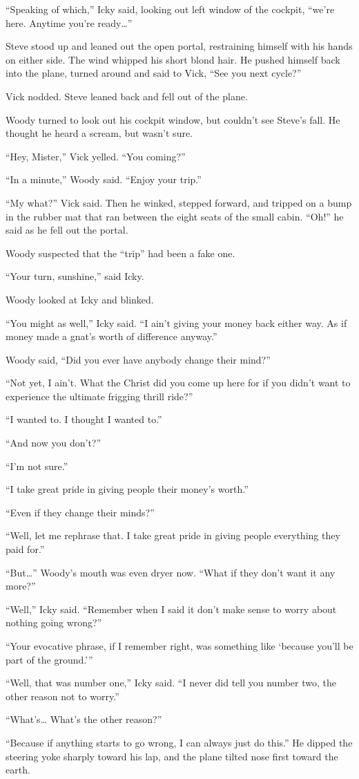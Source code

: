 “Speaking of which,” Icky said, looking out left window of the cockpit, “we’re here. Anytime you’re ready…”

Steve stood up and leaned out the open portal, restraining himself with his hands on either side. The wind whipped his short blond hair. He pushed himself back into the plane, turned around and said to Vick, “See you next cycle?”

Vick nodded. Steve leaned back and fell out of the plane.

Woody turned to look out his cockpit window, but couldn’t see Steve’s fall. He thought he heard a scream, but wasn’t sure.

“Hey, Mister,” Vick yelled. “You coming?”

“In a minute,” Woody said. “Enjoy your trip.”

“My what?” Vick said. Then he winked, stepped forward, and tripped on a bump in the rubber mat that ran between the eight seats of the small cabin. “Oh!” he said as he fell out the portal.

Woody suspected that the “trip” had been a fake one.

“Your turn, sunshine,” said Icky.

Woody looked at Icky and blinked.

“You might as well,” Icky said. “I ain’t giving your money back either way. As if money made a gnat’s worth of difference anyway.”

Woody said, “Did you ever have anybody change their mind?”

“Not yet, I ain’t. What the Christ did you come up here for if you didn’t want to experience the ultimate frigging thrill ride?”

“I wanted to. I thought I wanted to.”

“And now you don’t?”

“I’m not sure.”

“I take great pride in giving people their money’s worth.”

“Even if they change their minds?”

“Well, let me rephrase that. I take great pride in giving people everything they paid for.”

“But…” Woody’s mouth was even dryer now. “What if they don’t want it any more?”

“Well,” Icky said. “Remember when I said it don’t make sense to worry about nothing going wrong?”

“Your evocative phrase, if I remember right, was something like ‘because you’ll be part of the ground.’”

“Well, that was number one,” Icky said. “I never did tell you number two, the other reason not to worry.”

“What’s… What’s the other reason?”

“Because if anything starts to go wrong, I can always just do this.” He dipped the steering yoke sharply toward his lap, and the plane tilted nose first toward the earth.
